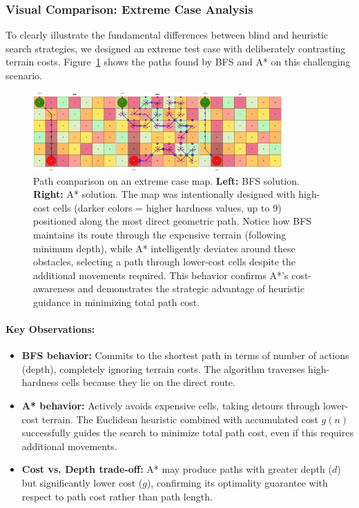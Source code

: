 \documentclass[11pt,a4paper]{article}
\begin{document}
\subsubsection{Visual Comparison: Extreme Case Analysis}

To clearly illustrate the fundamental differences between blind and heuristic search strategies, we designed an extreme test case with deliberately contrasting terrain costs. Figure~\ref{fig:comparison_large} shows the paths found by BFS and A* on this challenging scenario.

\begin{figure}[H]
\centering
\includegraphics[width=0.85\textwidth]{comparison_large.png}
\caption{Path comparison on an extreme case map. \textbf{Left:} BFS solution. \textbf{Right:} A* solution. The map was intentionally designed with high-cost cells (darker colors = higher hardness values, up to 9) positioned along the most direct geometric path. Notice how BFS maintains its route through the expensive terrain (following minimum depth), while A* intelligently deviates around these obstacles, selecting a path through lower-cost cells despite the additional movements required. This behavior confirms A*'s cost-awareness and demonstrates the strategic advantage of heuristic guidance in minimizing total path cost.}
\label{fig:comparison_large}
\end{figure}

\paragraph{Key Observations:}
\begin{itemize}[leftmargin=1.5cm,itemsep=0.1em]
    \item \textbf{BFS behavior:} Commits to the shortest path in terms of number of actions (depth), completely ignoring terrain costs. The algorithm traverses high-hardness cells because they lie on the direct route.
    \item \textbf{A* behavior:} Actively avoids expensive cells, taking detours through lower-cost terrain. The Euclidean heuristic combined with accumulated cost $g(n)$ successfully guides the search to minimize total path cost, even if this requires additional movements.
    \item \textbf{Cost vs. Depth trade-off:} A* may produce paths with greater depth ($d$) but significantly lower cost ($g$), confirming its optimality guarantee with respect to path cost rather than path length.
\end{itemize}
\end{document}

